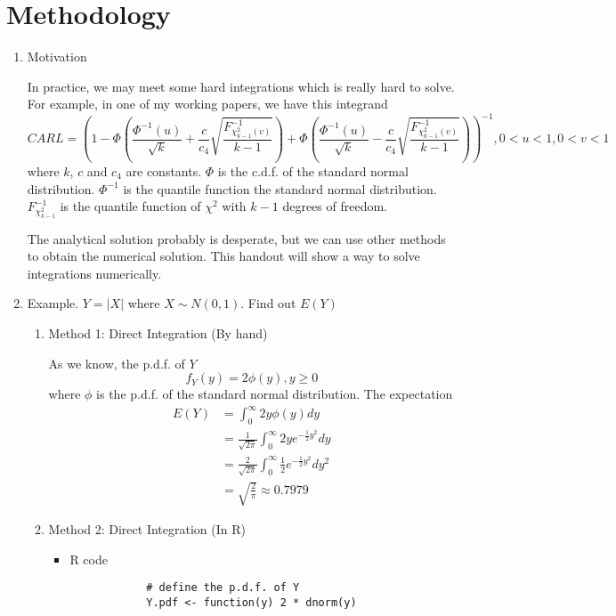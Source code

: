 \documentclass[12pt]{article}
\begin{document}
\section{Methodology}
\begin{enumerate}
	\item Motivation
	\par In practice, we may meet some hard integrations which is really hard to solve. For example, in one of my working papers, we have this integrand
	\begin{equation*}
	CARL = (1 - \Phi(\frac{\Phi^{-1}(u)}{\sqrt{k}} + \frac{c}{c_4}\sqrt{\frac{F^{-1}_{\chi^2_{k-1}(v)}}{k-1}}) + \Phi(\frac{\Phi^{-1}(u)}{\sqrt{k}} - \frac{c}{c_4}\sqrt{\frac{F^{-1}_{\chi^2_{k-1}(v)}}{k-1}}))^{-1}, 0<u<1, 0<v<1
	\end{equation*}
	where $k$, $c$ and $c_4$ are constants. $\Phi$ is the c.d.f. of the standard normal distribution. $\Phi^{-1}$ is the quantile function the standard normal distribution. $F^{-1}_{\chi^2_{k-1}}$ is the quantile function of $\chi^2$ with $k-1$ degrees of freedom. 
	\par The analytical solution probably is desperate, but we can use other methods to obtain the numerical solution. This handout will show a way to solve integrations numerically.
	
	\item Example. $Y = |X|$ where $X \sim N(0, 1)$. Find out $E(Y)$
	\begin{enumerate}
		\item Method 1: Direct Integration (By hand)
		\par As we know, the p.d.f. of $Y$
		\begin{equation*}
		f_Y(y) = 2\phi(y), y \ge 0
		\end{equation*}
		where $\phi$ is the p.d.f. of the standard normal distribution. The expectation
		\begin{equation*}
		\begin{split}
		E(Y) &= \int_{0}^{\infty} 2y\phi(y) dy \\
		& = \frac{1}{\sqrt{2\pi}}\int_{0}^{\infty} 2y e^{-\frac{1}{2}y^2}dy \\
		& = \frac{2}{\sqrt{2\pi}}\int_{0}^{\infty} \frac{1}{2} e^{-\frac{1}{2}y^2}dy^2 \\
		& = \sqrt{\frac{2}{\pi}} \approx 0.7979
		\end{split}
		\end{equation*}
		\item Method 2: Direct Integration (In R)
		\begin{itemize}
			\item R code
			\begin{verbatim}
			# define the p.d.f. of Y
			Y.pdf <- function(y) 2 * dnorm(y)
			

\end{verbatim}
\end{itemize}
\end{enumerate}
\end{enumerate}
\end{document}
